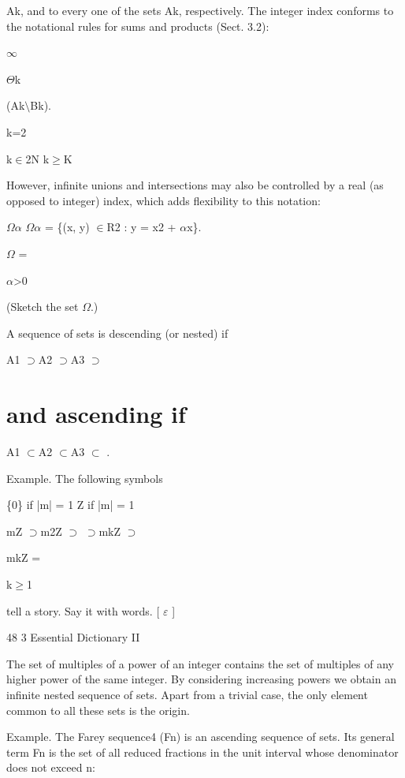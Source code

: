 \documentclass[11pt]{article}
\theoremstyle{plain}
\theoremstyle{definition}
\begin{document}
Ak, and to every one of the sets Ak, respectively. The integer index conforms to the notational rules for sums and products (Sect. 3.2):

$\infty$

$\Theta$k

(Ak$\setminus$Bk).

k=2

k$\in$2N k$\geq$K

However, infinite unions and intersections may also be controlled by a real (as opposed to integer) index, which adds flexibility to this notation:

$\Omega$$\alpha$ $\Omega$$\alpha$ = \{(x, y) $\in$R2 : y = x2 + $\alpha$x\}.

$\Omega$ =

$\alpha$>0

(Sketch the set $\Omega$.)

A sequence of sets is descending (or nested) if

A1 $\supset$A2 $\supset$A3 $\supset$\textperiodcentered{} \textperiodcentered{} \textperiodcentered{}

\section{and ascending if}

A1 $\subset$A2 $\subset$A3 $\subset$\textperiodcentered{} \textperiodcentered{} \textperiodcentered{} .

Example. The following symbols

\{0\} if |m| = 1 Z if |m| = 1

mZ $\supset$m2Z $\supset$\textperiodcentered{} \textperiodcentered{} \textperiodcentered{} $\supset$mkZ $\supset$\textperiodcentered{} \textperiodcentered{} \textperiodcentered{}

mkZ =

k$\geq$1

tell a story. Say it with words. [ $\varepsilon$ ]

48 3 Essential Dictionary II

The set of multiples of a power of an integer contains the set of multiples of any higher power of the same integer. By considering increasing powers we obtain an infinite nested sequence of sets. Apart from a trivial case, the only element common to all these sets is the origin.

Example. The Farey sequence4 (Fn) is an ascending sequence of sets. Its general term Fn is the set of all reduced fractions in the unit interval whose denominator does not exceed n:
\end{document}
